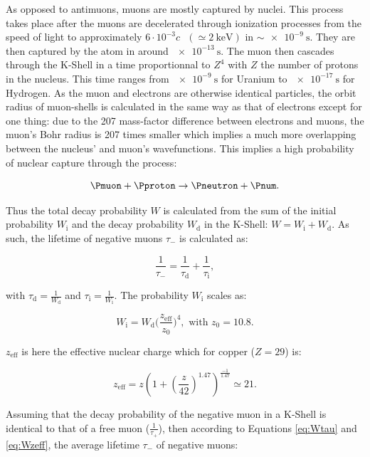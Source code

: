 As opposed to antimuons, muons are mostly captured by nuclei. This process takes place after the muons are decelerated through ionization processes from the speed of light to approximately $6\cdot10^{-3}c\text{ }(\simeq\SI{2}{\kilo\electronvolt})$ in $\sim \SI{e-9}{\second}$. They are then captured by the atom in around $\SI{e-13}{\second}$. The muon then cascades through the K-Shell in a time proportionnal to $Z^4$ with $Z$ the number of protons in the nucleus. This time ranges from $\SI{e-9}{\second}$ for Uranium to $\SI{e-17}{\second}$ for Hydrogen. As the muon and electrons are otherwise identical particles, the orbit radius of muon-shells is calculated in the same way as that of electrons except for one thing: due to the 207 mass-factor difference between electrons and muons, the muon's Bohr radius is 207 times smaller which implies a much more overlapping between the nucleus' and muon's wavefunctions. This implies a high probability of nuclear capture through the process:

\begin{equation}
\Pmuon + \Pproton \rightarrow \Pneutron + \Pnum.
\end{equation}

Thus the total decay probability $W$ is calculated from the sum of the initial probability $W_{\text{i}}$ and the decay probability $W_{\text{d}}$ in the K-Shell: $W=W_{\text{i}}+W_{\text{d}}$. As such, the lifetime of negative muons $\tau_-$ is calculated as:

\begin{equation}
\label{eq:Wtau}
\frac{1}{\tau_-}=\frac{1}{\tau_{\text{d}}}+\frac{1}{\tau_{\text{i}}},
\end{equation}

with $\tau_{\text{d}}=\frac{1}{W_{\text{d}}}$ and $\tau_{\text{i}}=\frac{1}{W_{\text{i}}}$. The probability $W_{\text{i}}$ scales as:

\begin{equation}
\label{eq:Wzeff}
W_{\text{i}}=W_{\text{d}}\Big( \frac{z_{\text{eff}}}{z_0}\Big)^4, \text{ with } z_0=10.8.
\end{equation}

$z_{\text{eff}}$ is here the effective nuclear charge which for copper ($Z=29$) is:

\begin{equation}
z_{\text{eff}}=z(1+(\frac{z}{42})^{1.47})^{\frac{-1}{1.47}}\simeq 21.
\end{equation}

Assuming that the decay probability of the negative muon in a K-Shell is identical to that of a free muon ($\frac{1}{\tau_{+}}$), then according to Equations \ref{eq:Wtau} and \ref{eq:Wzeff}, the average lifetime $\tau_-$ of negative muons:

